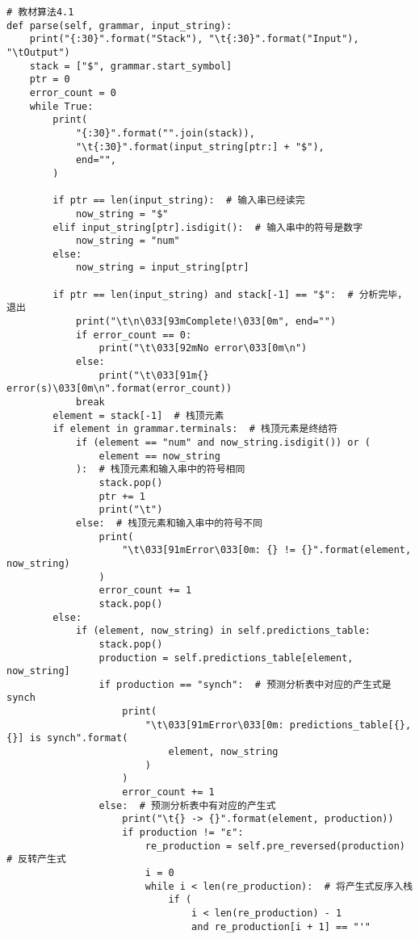 \documentclass[lang=cn,11pt,a4paper]{elegantpaper}
\begin{document}
\begin{lstlisting}
# 教材算法4.1
def parse(self, grammar, input_string):
    print("{:30}".format("Stack"), "\t{:30}".format("Input"), "\tOutput")
    stack = ["$", grammar.start_symbol]
    ptr = 0
    error_count = 0
    while True:
        print(
            "{:30}".format("".join(stack)),
            "\t{:30}".format(input_string[ptr:] + "$"),
            end="",
        )

        if ptr == len(input_string):  # 输入串已经读完
            now_string = "$"
        elif input_string[ptr].isdigit():  # 输入串中的符号是数字
            now_string = "num"
        else:
            now_string = input_string[ptr]

        if ptr == len(input_string) and stack[-1] == "$":  # 分析完毕，退出
            print("\t\n\033[93mComplete!\033[0m", end="")
            if error_count == 0:
                print("\t\033[92mNo error\033[0m\n")
            else:
                print("\t\033[91m{} error(s)\033[0m\n".format(error_count))
            break
        element = stack[-1]  # 栈顶元素
        if element in grammar.terminals:  # 栈顶元素是终结符
            if (element == "num" and now_string.isdigit()) or (
                element == now_string
            ):  # 栈顶元素和输入串中的符号相同
                stack.pop()
                ptr += 1
                print("\t")
            else:  # 栈顶元素和输入串中的符号不同
                print(
                    "\t\033[91mError\033[0m: {} != {}".format(element, now_string)
                )
                error_count += 1
                stack.pop()
        else:
            if (element, now_string) in self.predictions_table:
                stack.pop()
                production = self.predictions_table[element, now_string]
                if production == "synch":  # 预测分析表中对应的产生式是synch
                    print(
                        "\t\033[91mError\033[0m: predictions_table[{}, {}] is synch".format(
                            element, now_string
                        )
                    )
                    error_count += 1
                else:  # 预测分析表中有对应的产生式
                    print("\t{} -> {}".format(element, production))
                    if production != "ε":
                        re_production = self.pre_reversed(production)  # 反转产生式
                        i = 0
                        while i < len(re_production):  # 将产生式反序入栈
                            if (
                                i < len(re_production) - 1
                                and re_production[i + 1] == "'"

\end{lstlisting}
\end{document}
